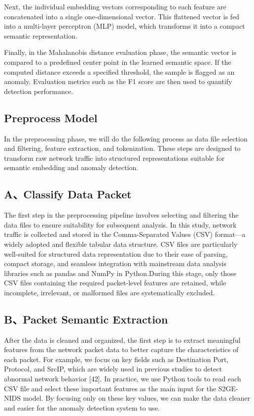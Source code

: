 \begin{ZhChapter}
Next, the individual embedding vectors corresponding to each feature are concatenated into a single one-dimensional vector. This flattened vector is fed into a multi-layer perceptron (MLP) model, which transforms it into a compact semantic representation.

Finally, in the Mahalanobis distance evaluation phase, the semantic vector is compared to a predefined center point in the learned semantic space. If the computed distance exceeds a specified threshold, the sample is flagged as an anomaly. Evaluation metrics such as the F1 score are then used to quantify detection performance.

\subsection{Preprocess Model}
In the preprocessing phase, we will do the following process as data file selection and filtering, feature extraction, and tokenization. These steps are designed to transform raw network traffic into structured representations suitable for semantic embedding and anomaly detection. 

\subsection*{A、Classify Data Packet}

The first step in the preprocessing pipeline involves selecting and filtering the data files to ensure suitability for subsequent analysis. In this study, network traffic is collected and stored in the Comma-Separated Values (CSV) format—a widely adopted and flexible tabular data structure. CSV files are particularly well-suited for structured data representation due to their ease of parsing, compact storage, and seamless integration with mainstream data analysis libraries such as pandas and NumPy in Python.During this stage, only those CSV files containing the required packet-level features are retained, while incomplete, irrelevant, or malformed files are systematically excluded. 

\subsection*{B、Packet Semantic Extraction}

After the data is cleaned and organized, the first step is to extract meaningful features from the network packet data to better capture the characteristics of each packet. For example, we focus on key fields such as Destination Port, Protocol, and SrcIP, which are widely used in previous studies to detect abnormal network behavior  [42]. 
In practice, we use Python tools to read each CSV file and select these important features as the main input for the S2GE-NIDS model. By focusing only on these key values, we can make the data cleaner and easier for the anomaly detection system to use.


\end{ZhChapter}
